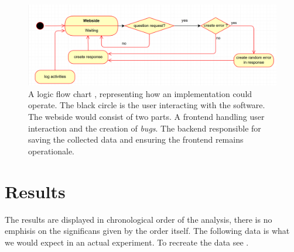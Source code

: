 \documentclass[runningheads]{llncs}
\begin{document}
\begin{figure}
    \includegraphics[width=\textwidth]{UML Prototyp.PNG}
    \caption{A logic flow chart , representing how an implementation could operate.
    The black circle is the user interacting with the software. The webside would
    consist of two parts. A frontend handling user interaction and the creation of {\itshape bugs}.
    The backend responsible for saving the collected data and ensuring the frontend
    remains operationale.} \label{fig1}
\end{figure}
\newpage
\section{Results}
The results are displayed in chronological order of the analysis, there is
no emphisis on the significans given by the order itself. The following data is
what we would expect in an actual experiment. To recreate the data see \cite{ref_soft}.
\end{document}
